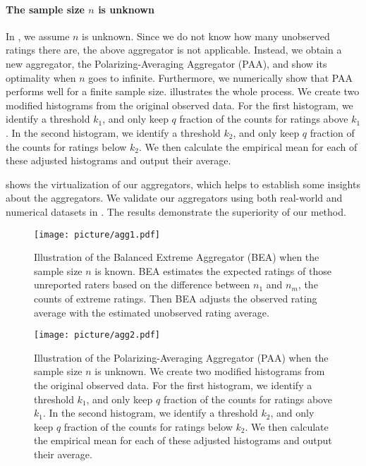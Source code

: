 \paragraph{The sample size $n$ is unknown} In , we assume $n$ is unknown. Since we do not know how many unobserved ratings there are, the above aggregator is not applicable. Instead, we obtain a new aggregator, the Polarizing-Averaging Aggregator (PAA), and show its optimality when $n$ goes to infinite. Furthermore, we numerically show that PAA performs well for a finite sample size.  illustrates the whole process. We create two modified histograms from the original observed data. For the first histogram, we identify a threshold $k_1$, and only keep $q$ fraction of the counts for ratings above $k_1$. In the second histogram, we identify a threshold $k_2$, and only keep $q$ fraction of the counts for ratings below $k_2$. We then calculate the empirical mean for each of these adjusted histograms and output their average. 

 shows the virtualization of our aggregators, which helps to establish some insights about the aggregators.
We validate our aggregators using both real-world and numerical datasets in . The results demonstrate the superiority of our method.



\begin{figure}[h]
  \centering
  \texttt{[image: picture/agg1.pdf]}
  \caption{Illustration of the Balanced Extreme Aggregator (BEA) when the sample size $n$ is known. BEA estimates the expected ratings of those unreported raters based on the difference between $n_1$ and $n_m$, the counts of extreme ratings. Then BEA adjusts the observed rating average with the estimated unobserved rating average.}
  \label{fig:finite}
\end{figure}



\begin{figure}[h]
  \centering
  \texttt{[image: picture/agg2.pdf]}
  \caption{Illustration of the Polarizing-Averaging Aggregator (PAA) when the sample size $n$ is unknown. We create two modified histograms from the original observed data. For the first histogram, we identify a threshold $k_1$, and only keep $q$ fraction of the counts for ratings above $k_1$. In the second histogram, we identify a threshold $k_2$, and only keep $q$ fraction of the counts for ratings below $k_2$. We then calculate the empirical mean for each of these adjusted histograms and output their average. }
  \label{fig:infinite}
\end{figure}